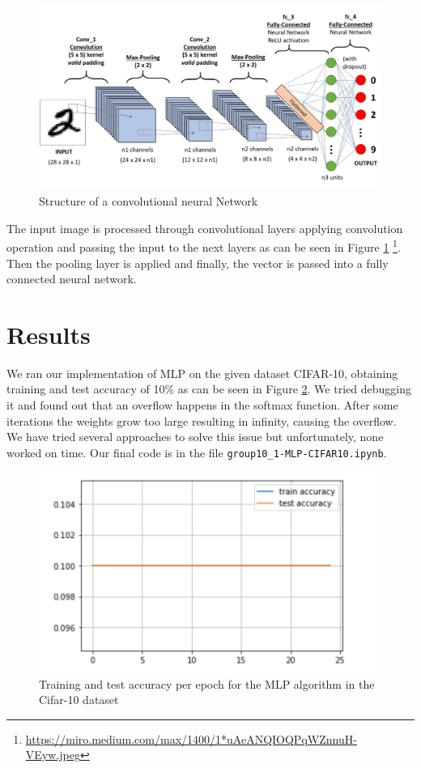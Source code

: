 \documentclass[conference]{IEEEtran}
\begin{document}
\begin{figure}[H]
\centering
\includegraphics[scale = 0.18]{figs/CNN.jpeg}
\caption{Structure of a convolutional neural Network}
\label{fig:CNNstructire}
\end{figure}

The input image is processed through convolutional layers applying convolution operation and passing the input to the next layers as can be seen in Figure \ref{fig:CNNstructire} \footnote{\url{https://miro.medium.com/max/1400/1*uAeANQIOQPqWZnnuH-VEyw.jpeg}}. Then the pooling layer is applied and finally, the vector is passed into a fully connected neural network\cite{CNNnetwork}.

\section{Results}
\label{section:results}

We ran our implementation of MLP on the given dataset CIFAR-10, obtaining training and test accuracy of 10\% as can be seen in Figure \ref{fig:Cifar10Train}. We tried debugging it and found out that an overflow happens in the softmax function. After some iterations the weights grow too large resulting in infinity, causing the overflow. We have tried several approaches to solve this issue but unfortunately, none worked on time. Our final code is in the file \texttt{group10\_1-MLP-CIFAR10.ipynb}.

\begin{figure}[H]
\centering
\includegraphics[scale = 0.50]{figs/trainandtestMLP.png}
\caption{Training and test accuracy per epoch for the MLP algorithm in the Cifar-10 dataset }
\label{fig:Cifar10Train}
\end{figure}
\end{document}
